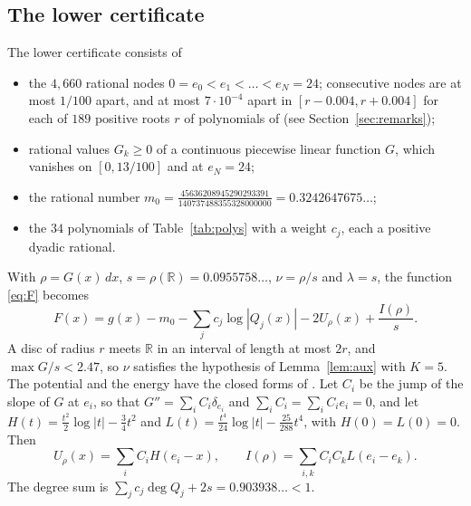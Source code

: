 \documentclass[11pt]{amsart}
\theoremstyle{remark}
\numberwithin{equation}{section}
\newcommand{\R}{\mathbb{R}}
\newcommand{\MzeroFrac}{\tfrac{45636208945290293391}{140737488355328000000}}
\newcommand{\MzeroDec}{0.3242647675}
\newcommand{\NPolyLo}{34}
\newcommand{\NNodesLo}{4{,}660}
\newcommand{\SvalLo}{0.0955758}
\newcommand{\BudgetLo}{0.903938}
\newcommand{\GmaxRatio}{2.47}
\newcommand{\Kconst}{5}
\begin{document}
\subsection{The lower certificate}
The lower certificate consists of
\begin{itemize}[leftmargin=1.5em]
\item the $\NNodesLo$ rational nodes $0=e_0<e_1<\dots<e_N=24$; consecutive nodes are at most $1/100$ apart, and at most $7\cdot10^{-4}$ apart in $[r-0.004,r+0.004]$ for each of $189$ positive roots $r$ of polynomials of \cite[Table~2]{Fla15} (see Section~\ref{sec:remarks});
\item rational values $G_k\ge0$ of a continuous piecewise linear function $G$, which vanishes on $[0,13/100]$ and at $e_N=24$;
\item the rational number $m_0=\MzeroFrac=\MzeroDec\ldots$;
\item the $\NPolyLo$ polynomials of Table~\ref{tab:polys} with a weight $c_j$, each a positive dyadic rational.
\end{itemize}
With $\rho=G(x)\,dx$, $s=\rho(\R)=\SvalLo\ldots$, $\nu=\rho/s$ and $\lambda=s$, the function \eqref{eq:F} becomes
\begin{equation}\label{eq:Fcert}
F(x)=g(x)-m_0-\sum_jc_j\log|Q_j(x)|-2U_\rho(x)+\frac{I(\rho)}s.
\end{equation}
A disc of radius $r$ meets $\R$ in an interval of length at most $2r$, and $\max G/s<\GmaxRatio$, so $\nu$ satisfies the hypothesis of Lemma~\ref{lem:aux} with $K=\Kconst$. The potential and the energy have the closed forms of \cite[Lemma~3.1]{Tom26a}. Let $C_i$ be the jump of the slope of $G$ at $e_i$, so that $G''=\sum_iC_i\delta_{e_i}$ and $\sum_iC_i=\sum_iC_ie_i=0$, and let $H(t)=\frac{t^2}2\log|t|-\frac34t^2$ and $L(t)=\frac{t^4}{24}\log|t|-\frac{25}{288}t^4$, with $H(0)=L(0)=0$. Then
\[
U_\rho(x)=\sum_iC_iH(e_i-x),\qquad I(\rho)=\sum_{i,k}C_iC_kL(e_i-e_k).
\]
The degree sum is $\sum_jc_j\deg Q_j+2s=\BudgetLo\ldots<1$.
\end{document}
